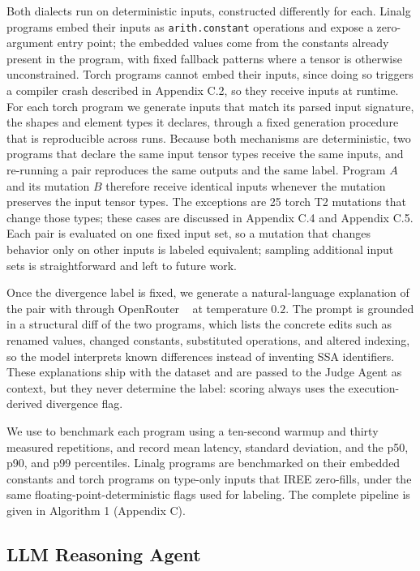 \documentclass[sigplan,screen,review,anonymous]{acmart}
\begin{document}
Both dialects run on deterministic inputs, constructed differently for each.
Linalg programs embed their inputs as \texttt{arith.constant} operations and
expose a zero-argument entry point; the embedded values come from the constants
already present in the program, with fixed fallback patterns where a tensor is
otherwise unconstrained. Torch programs cannot embed their inputs, since doing so triggers a compiler crash described in Appendix C.2, so they receive inputs at runtime. For each torch program we generate inputs that match its parsed input
signature, the shapes and element types it declares, through a fixed generation
procedure that is reproducible across runs. Because both mechanisms are
deterministic, two programs that declare the same input tensor types receive the
same inputs, and re-running a pair reproduces the same outputs and the same label.
Program $A$ and its mutation $B$ therefore receive identical inputs whenever the
mutation preserves the input tensor types. The exceptions are 25 torch T2 mutations that change those types; these cases are discussed in Appendix C.4 and Appendix C.5. Each pair is evaluated on one
fixed input set, so a mutation that changes behavior only on other inputs is
labeled equivalent; sampling additional input sets is straightforward and left to
future work.

Once the divergence label is fixed, we generate a natural-language explanation of
the pair with  through OpenRouter%
~\cite{openrouter2025} at temperature $0.2$. The prompt is grounded in a
structural diff of the two programs, which lists the concrete edits such as
renamed values, changed constants, substituted operations, and altered indexing,
so the model interprets known differences instead of inventing SSA identifiers.
These explanations ship with the dataset and are passed to the Judge Agent as
context, but they never determine the label: scoring always uses the
execution-derived divergence flag.

We use  to benchmark each program using a ten-second
warmup and thirty measured repetitions, and record mean latency, standard
deviation, and the p50, p90, and p99 percentiles. Linalg programs are benchmarked
on their embedded constants and torch programs on type-only inputs that IREE
zero-fills, under the same floating-point-deterministic flags used for labeling.
The complete pipeline is given in Algorithm 1 
(Appendix C).

\subsection{LLM Reasoning Agent}
\label{sec:reasoning_agent}
\end{document}
